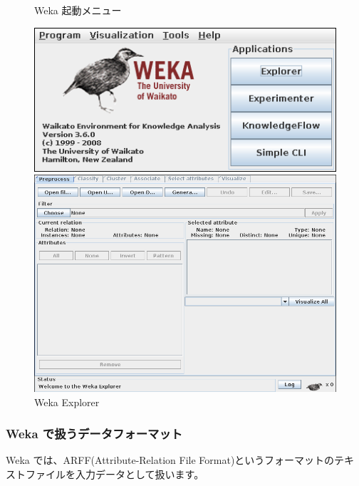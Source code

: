 \documentclass[mingoth,a4paper]{jsarticle}
\begin{document}
\begin{figure}[H]
\begin{minipage}{0.4\hsize}
 \begin{center}
 \caption{Weka 起動メニュー}
 \includegraphics[width=1\hsize]{image201003/weka0.png}
 \end{center}
\end{minipage}
\begin{minipage}{0.5\hsize}
 \begin{center}
 \caption{Weka Explorer}
 \includegraphics[width=1\hsize]{image201003/weka1.png}
 \end{center}
\end{minipage}
\end{figure}

\subsubsection{Weka で扱うデータフォーマット}

Weka では、ARFF(Attribute-Relation File Format)というフォーマットのテキ
ストファイルを入力データとして扱います。
\end{document}
